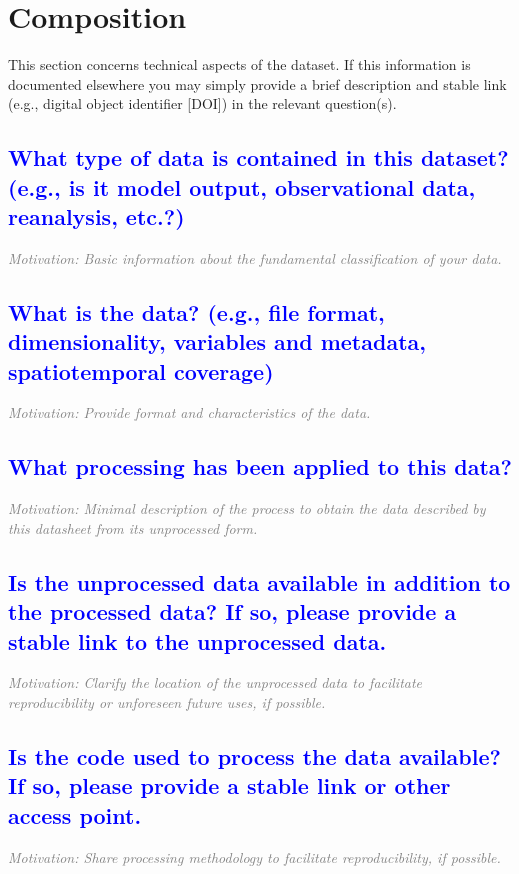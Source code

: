 \documentclass[letterpaper, 10 pt, transmag]{IEEEtran}
\begin{document}
\section{Composition}
This section concerns technical aspects of the dataset. If this information is documented elsewhere you may simply provide a brief description and stable link (e.g., digital object identifier [DOI]) in the relevant question(s).

\textcolor{blue}{\subsection{What type of data is contained in this dataset? (e.g., is it model output, observational data, reanalysis, etc.?)}}
\textcolor{gray}{\textit{Motivation: Basic information about the fundamental classification of your data.}}

\textcolor{blue}{\subsection{What is the data? (e.g., file format, dimensionality, variables and metadata, spatiotemporal coverage)}}
\textcolor{gray}{\textit{Motivation: Provide format and characteristics of the data.}}

\textcolor{blue}{\subsection{What processing has been applied to this data?}}
\textcolor{gray}{\textit{Motivation: Minimal description of the process to obtain the data described by this datasheet from its unprocessed form.}}

\textcolor{blue}{\subsection{Is the unprocessed data available in addition to the processed data? If so, please provide a stable link to the unprocessed data.}}
\textcolor{gray}{\textit{Motivation: Clarify the location of the unprocessed data to facilitate reproducibility or unforeseen future uses, if possible.}}

\textcolor{blue}{\subsection{Is the code used to process the data available? If so, please provide a stable link or other access point.}}
\textcolor{gray}{\textit{Motivation: Share processing methodology to facilitate reproducibility, if possible.}}
\end{document}
